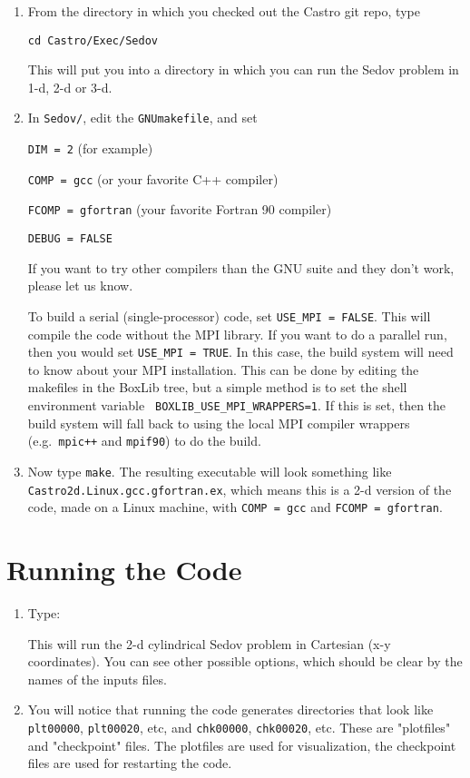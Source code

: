 \begin{enumerate}

\item From the directory in which you checked out the Castro git repo, type

{\tt cd Castro/Exec/Sedov}

This will put you into a directory in which you can run the Sedov problem in 1-d, 2-d or 3-d.
\item In {\tt Sedov/}, edit the {\tt GNUmakefile}, and set

{\tt DIM = 2} (for example)

{\tt COMP = gcc} (or your favorite C++ compiler)

{\tt FCOMP = gfortran} (your favorite Fortran 90 compiler)

{\tt DEBUG = FALSE}

If you want to try other compilers than the GNU suite and they don't work, 
please let us know.  

To build a serial (single-processor) code, set {\tt USE\_MPI = FALSE}.
This will compile the code without the MPI library.  If you want to do
a parallel run, then you would set {\tt USE\_MPI = TRUE}.  In this
case, the build system will need to know about your MPI installation.
This can be done by editing the makefiles in the BoxLib tree, but a
simple method is to set the shell environment variable {\tt
  BOXLIB\_USE\_MPI\_WRAPPERS=1}.  If this is set, then the build
system will fall back to using the local MPI compiler wrappers
(e.g.\ {\tt mpic++} and {\tt mpif90}) to do the build.

\item Now type {\tt make}. The resulting executable will look something like 
{\tt Castro2d.Linux.gcc.gfortran.ex}, which means this is a 2-d version of the code, 
made on a Linux machine, with {\tt COMP = gcc} and {\tt FCOMP = gfortran}.

\end{enumerate}

\section{Running the Code}

\begin{enumerate}

\item Type:


\noindent This will run the 2-d cylindrical Sedov problem in Cartesian (x-y coordinates). 
You can see other possible options, which should be clear by the names of the inputs files.

\item You will notice that running the code generates directories that look like 
{\tt plt00000}, {\tt plt00020}, etc, and {\tt chk00000}, {\tt chk00020}, etc. These are "plotfiles" and 
"checkpoint" files. The plotfiles are used for visualization, the checkpoint files are 
used for restarting the code.

\end{enumerate}

